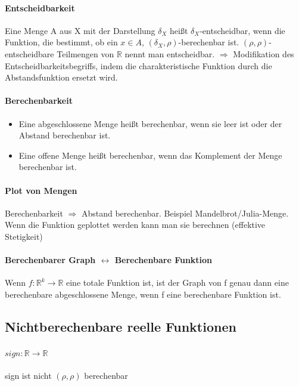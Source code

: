 \documentclass[ngerman]{scrartcl}
\begin{document}
\paragraph{Entscheidbarkeit}
Eine Menge A aus X mit der Darstellung $ \delta_X $ heißt $ \delta_X $-entscheidbar, wenn die Funktion, die bestimmt, ob ein $ x \in A $, $(\delta_X, \rho)$-berechenbar ist. $(\rho, \rho) $-entscheidbare Teilmengen von $\mathbb{R}$ nennt man entscheidbar. $\Rightarrow $ Modifikation des Entscheidbarkeitsbegriffs, indem die charakteristische Funktion durch die Abstandsfunktion ersetzt wird.

\paragraph{Berechenbarkeit}
\begin{itemize}
  \item Eine abgeschlossene Menge heißt berechenbar, wenn sie leer ist oder der Abstand berechenbar ist.
  \item Eine offene Menge heißt berechenbar, wenn das Komplement der Menge berechenbar ist.
\end{itemize}


\paragraph{Plot von Mengen} Berechenbarkeit $ \Rightarrow $ Abstand berechenbar. Beispiel Mandelbrot/Julia-Menge. Wenn die Funktion geplottet werden kann man sie berechnen (effektive Stetigkeit)

\paragraph{Berechenbarer Graph $ \leftrightarrow $ Berechenbare Funktion}
Wenn $ f: \mathbb{R}^k \rightarrow \mathbb{R} $ eine totale Funktion ist, ist der Graph von f genau dann eine berechenbare abgeschlossene Menge, wenn f eine berechenbare Funktion ist.

\subsection{Nichtberechenbare reelle Funktionen}
\paragraph{$ sign : \mathbb{R} \rightarrow \mathbb{R} $} sign ist nicht $ (\rho, \rho)$ berechenbar
\end{document}
